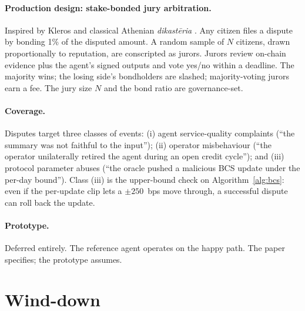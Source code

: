 \documentclass[10pt,conference,letterpaper]{IEEEtran}
\theoremstyle{definition}
\begin{document}
\paragraph{Production design: stake-bonded jury arbitration.}
Inspired by Kleros \cite{kleros2017} and classical Athenian
\emph{dikast\=eria} \cite{hansen1999athenian}. Any citizen files a
dispute by bonding 1\% of the disputed amount. A random sample of $N$
citizens, drawn proportionally to reputation, are conscripted as
jurors. Jurors review on-chain evidence plus the agent's signed
outputs and vote yes/no within a deadline. The majority wins; the
losing side's bondholders are slashed; majority-voting jurors earn a
fee. The jury size $N$ and the bond ratio are governance-set.

\paragraph{Coverage.} Disputes target three classes of events:
(i) agent service-quality complaints (``the summary was not faithful
to the input''); (ii) operator misbehaviour (``the operator
unilaterally retired the agent during an open credit cycle''); and
(iii) protocol parameter abuses (``the oracle pushed a malicious BCS
update under the per-day bound''). Class (iii) is the
upper-bound check on Algorithm~\ref{alg:bcs}: even if the per-update
clip lets a $\pm 250$~bps move through, a successful dispute can roll
back the update.

\paragraph{Prototype.} Deferred entirely. The reference agent
operates on the happy path. The paper specifies; the prototype
assumes.

\section{Wind-down}\label{sec:winddown}
\end{document}
